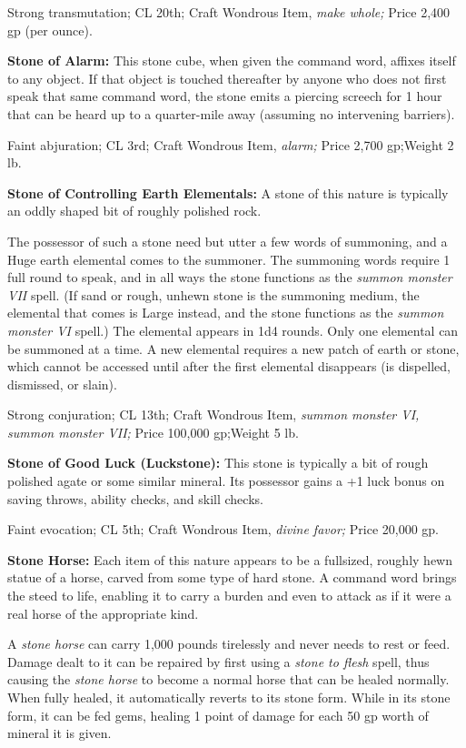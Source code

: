 Strong transmutation; CL 20th; Craft Wondrous Item, \textit{make whole; }Price 
2,400 gp (per ounce).

\textbf{Stone of Alarm:} This stone cube, when given the command word, affixes 
itself to any object. If that object is touched thereafter by anyone who does not 
first speak that same command word, the stone emits a piercing screech for 1 hour 
that can be heard up to a quarter-mile away (assuming no intervening barriers).

Faint abjuration; CL 3rd; Craft Wondrous Item, \textit{alarm; }Price 2,700 gp;Weight 
2 lb.

\textbf{Stone of Controlling Earth Elementals:} A stone of this nature is typically 
an oddly shaped bit of roughly polished rock.

The possessor of such a stone need but utter a few words of summoning, and a Huge 
earth elemental comes to the summoner. The summoning words require 1 full round 
to speak, and in all ways the stone functions as the \textit{summon monster VII 
}spell. (If sand or rough, unhewn stone is the summoning medium, the elemental 
that comes is Large instead, and the stone functions as the \textit{summon monster 
VI }spell.) The elemental appears in 1d4 rounds. Only one elemental can be summoned 
at a time. A new elemental requires a new patch of earth or stone, which cannot 
be accessed until after the first elemental disappears (is dispelled, dismissed, 
or slain).

Strong conjuration; CL 13th; Craft Wondrous Item, \textit{summon monster VI, summon 
monster VII; }Price 100,000 gp;Weight 5 lb.

\textbf{Stone of Good Luck (Luckstone):} This stone is typically a bit of rough 
polished agate or some similar mineral. Its possessor gains a +1 luck bonus on 
saving throws, ability checks, and skill checks.

Faint evocation; CL 5th; Craft Wondrous Item, \textit{divine favor; }Price 20,000 
gp.

\textbf{Stone Horse:} Each item of this nature appears to be a fullsized, roughly 
hewn statue of a horse, carved from some type of hard stone. A command word brings 
the steed to life, enabling it to carry a burden and even to attack as if it were 
a real horse of the appropriate kind.

A \textit{stone horse }can carry 1,000 pounds tirelessly and never needs to rest 
or feed. Damage dealt to it can be repaired by first using a \textit{stone to flesh 
}spell, thus causing the \textit{stone horse }to become a normal horse that can 
be healed normally. When fully healed, it automatically reverts to its stone form. 
While in its stone form, it can be fed gems, healing 1 point of damage for each 
50 gp worth of mineral it is given.

